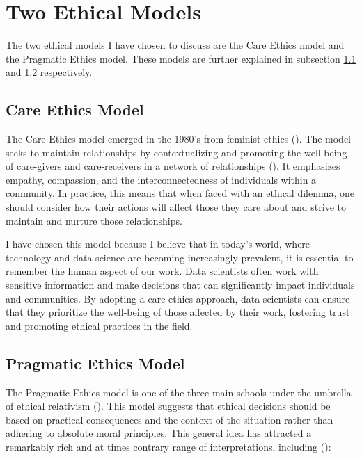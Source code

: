 \documentclass[11pt, twoside]{article}
\numberwithin{equation}{section}
\begin{document}

\newpage
{}
\setcounter{page}{1}

\section{Two Ethical Models}
The two ethical models I have chosen to discuss are the Care Ethics model and the Pragmatic Ethics model. These models are further explained in subsection \ref{sub:care-ethics-model} and \ref{sub:pragmatic-ethics-model} respectively.

\subsection{Care Ethics Model}\label{sub:care-ethics-model}
The Care Ethics model emerged in the 1980's from feminist ethics (\cite{uvh-care-ethics}). The model seeks to maintain relationships by contextualizing and promoting the well-being of care-givers and care-receivers in a network of relationships (\cite{iep-care-ethics}). It emphasizes empathy, compassion, and the interconnectedness of individuals within a community. In practice, this means that when faced with an ethical dilemma, one should consider how their actions will affect those they care about and strive to maintain and nurture those relationships.

I have chosen this model because I believe that in today's world, where technology and data science are becoming increasingly prevalent, it is essential to remember the human aspect of our work. Data scientists often work with sensitive information and make decisions that can significantly impact individuals and communities. By adopting a care ethics approach, data scientists can ensure that they prioritize the well-being of those affected by their work, fostering trust and promoting ethical practices in the field.

\subsection{Pragmatic Ethics Model}\label{sub:pragmatic-ethics-model}
The Pragmatic Ethics model is one of the three main schools under the umbrella of ethical relativism (\cite{gotquestions-pragmatic-ethics}). This model suggests that ethical decisions should be based on practical consequences and the context of the situation rather than adhering to absolute moral principles. This general idea has attracted a remarkably rich and at times contrary range of interpretations, including (\cite{sep-pragmatism}): 
\end{document}
